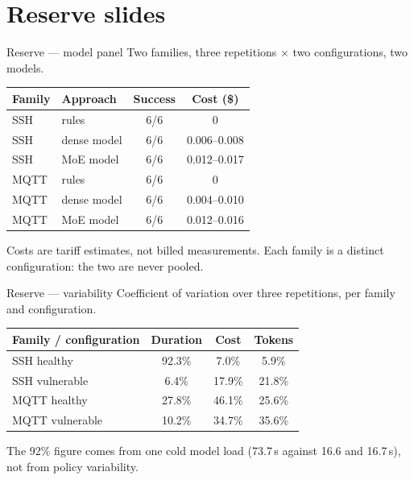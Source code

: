 \documentclass[aspectratio=169,10pt]{beamer}
\begin{document}
\section*{Reserve slides}

\begin{frame}{Reserve --- model panel}
  \centering\small
  Two families, three repetitions $\times$ two configurations, two models.

  \vspace{0.6em}
  \begin{tabular}{@{}llcc@{}}
    \toprule
    Family & Approach & Success & Cost (\$) \\
    \midrule
    SSH  & rules       & 6/6 & 0 \\
    SSH  & dense model & 6/6 & 0.006--0.008 \\
    SSH  & MoE model   & 6/6 & 0.012--0.017 \\
    MQTT & rules       & 6/6 & 0 \\
    MQTT & dense model & 6/6 & 0.004--0.010 \\
    MQTT & MoE model   & 6/6 & 0.012--0.016 \\
    \bottomrule
  \end{tabular}

  \vspace{0.8em}
  \scriptsize Costs are tariff estimates, not billed measurements.
  Each family is a distinct configuration: the two are never pooled.
\end{frame}

\begin{frame}{Reserve --- variability}
  \centering\small
  Coefficient of variation over three repetitions, per family and configuration.

  \vspace{0.6em}
  \begin{tabular}{@{}lccc@{}}
    \toprule
    Family / configuration & Duration & Cost & Tokens \\
    \midrule
    SSH healthy      & 92.3\% & 7.0\%  & 5.9\%  \\
    SSH vulnerable   & 6.4\%  & 17.9\% & 21.8\% \\
    MQTT healthy     & 27.8\% & 46.1\% & 25.6\% \\
    MQTT vulnerable  & 10.2\% & 34.7\% & 35.6\% \\
    \bottomrule
  \end{tabular}

  \vspace{0.8em}
  \scriptsize The 92\% figure comes from one cold model load (73.7\,s against
  16.6 and 16.7\,s), not from policy variability.
\end{frame}
\end{document}
